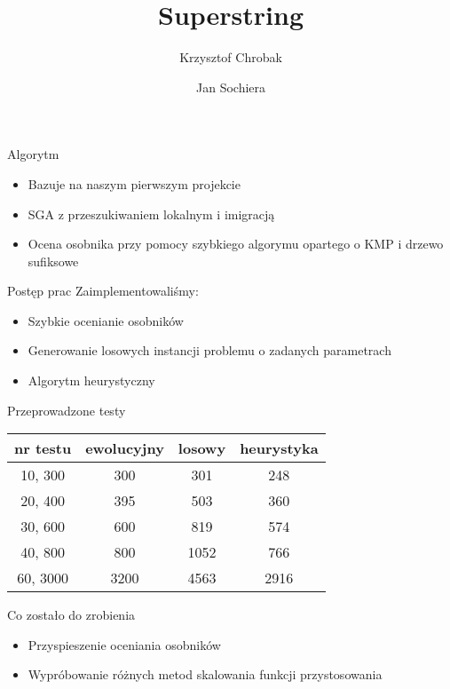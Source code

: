 \documentclass[10pt]{beamer}
\title{Superstring}
\author{Krzysztof Chrobak\and Jan Sochiera}
\institute{Algorytmy Ewolucyjne 2012/2013}
\begin{document}
\begin{frame}
\titlepage
\end{frame}

\begin{frame}{Algorytm}
\begin{itemize}
    \item <1-> Bazuje na naszym pierwszym projekcie
    \item <2-> SGA z przeszukiwaniem lokalnym i imigracją
    \item <3-> Ocena osobnika przy pomocy szybkiego algorymu opartego o KMP i drzewo sufiksowe
\end{itemize}
\end{frame}

\begin{frame}{Postęp prac}
Zaimplementowaliśmy:
\begin{itemize}
  \item <1-> Szybkie ocenianie osobników
  \item <2-> Generowanie losowych instancji problemu o zadanych parametrach
  \item <3-> Algorytm heurystyczny
\end{itemize}
\end{frame}

\begin{frame}{Przeprowadzone testy}
  \begin{center}
  \begin{tabular}{c|c|c|c}
    nr testu & ewolucyjny & losowy & heurystyka\\
    \hline
    10, 300 & 300 & 301 & 248\\
    20, 400 & 395 & 503 & 360\\
    30, 600 & 600 & 819 & 574\\
    40, 800 & 800 & 1052 & 766\\
    60, 3000 & 3200 & 4563 &  2916\\
  \end{tabular}
  \end{center}
\end{frame}

\begin{frame}{Co zostało do zrobienia}
\begin{itemize}
  \item <1-> Przyspieszenie oceniania osobników
  \item <2-> Wypróbowanie różnych metod skalowania funkcji przystosowania
\end{itemize}
\end{frame}
\end{document}
